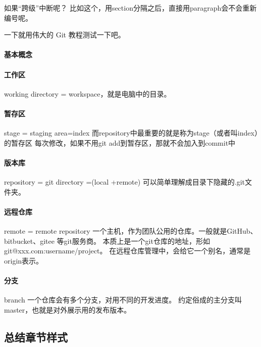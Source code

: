 \documentclass[../Main/thesis]{subfiles}
\begin{document}
如果“跨级”中断呢？
比如这个，用section分隔之后，直接用paragraph会不会重新编号呢。

一下就用伟大的 Git 教程测试一下吧。

\paragraph{基本概念} \label{par:git-concept}

\paragraph{工作区}
working directory = workspace，就是电脑中的目录。

\paragraph{暂存区}
stage = staging area=index
而repository中最重要的就是称为stage（或者叫index）的暂存区
每次修改，如果不用git add到暂存区，那就不会加入到commit中

\paragraph{版本库}
repository = git directory =(local +remote)
可以简单理解成目录下隐藏的.git文件夹。

\paragraph{远程仓库}
remote = remote repository
一个主机，作为团队公用的仓库。一般就是GitHub、bitbucket、gitee 等git服务商。
本质上是一个git仓库的地址，形如 git@xxx.com:username/project。
在远程仓库管理中，会给它一个别名，通常是origin表示。

\paragraph{分支}
branch
一个仓库会有多个分支，对用不同的开发进度。
约定俗成的主分支叫master，也就是对外展示用的发布版本。

\subsection{总结章节样式}
\label{ssc:summary-title-formats}
\end{document}
